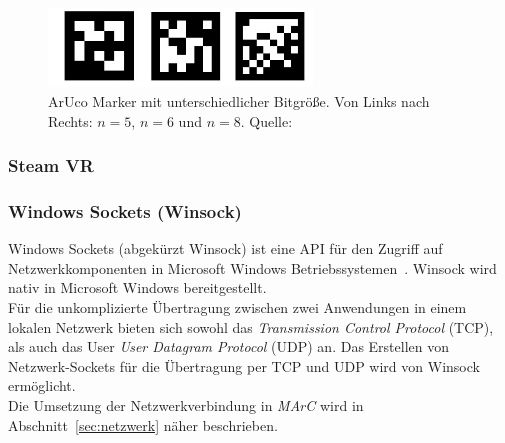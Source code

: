 \begin{figure}[H] 
	\center 
	\includegraphics[width=7cm]{Bilder/VerschAruco.jpg}			
	\caption{ArUco Marker mit unterschiedlicher Bitgröße. Von Links nach Rechts: $n=5$, $n=6$ und $n=8$. Quelle: \cite{article:Aruco2014}}
	\label{fig:SizesArucoMarker}
\end{figure}

\subsubsection{Steam VR}
\subsubsection{Windows Sockets (Winsock)}\label{sec:Winsock}
Windows Sockets (abgekürzt Winsock) ist eine API für den Zugriff auf Netzwerkkomponenten in Microsoft Windows Betriebssystemen~\cite{quinn1998windows}. Winsock wird nativ in Microsoft Windows bereitgestellt.\\ 
Für die unkomplizierte Übertragung zwischen zwei Anwendungen in einem lokalen Netzwerk bieten sich sowohl das \emph{Transmission Control Protocol} (TCP), als auch das User \emph{User Datagram Protocol} (UDP) an. Das Erstellen von Netzwerk-Sockets für die Übertragung per TCP und UDP wird von Winsock ermöglicht.\\ Die Umsetzung der Netzwerkverbindung in \emph{MArC} wird in Abschnitt~\ref{sec:netzwerk} näher beschrieben.
\newpage